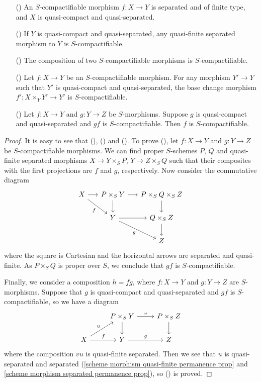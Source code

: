 \begin{proposition}\label{scheme S-compactifiable morphism permanence prop}
\begin{enumerate}
    \item[(\rmnum{1})] An $S$-compactifiable morphism $f:X\to Y$ is separated and of finite type, and $X$ is quasi-compact and quasi-separated.
    \item[(\rmnum{2})] If $Y$ is quasi-compact and quasi-separated, any quasi-finite separated morphism to $Y$ is $S$-compactifiable.
    \item[(\rmnum{3})] The composition of two $S$-compactifiable morphisms is $S$-compactifiable.
    \item[(\rmnum{4})] Let $f:X\to Y$ be an $S$-compactifiable morphism. For any morphism $Y'\to Y$ such that $Y'$ is quasi-compact and quasi-separated, the base change morphism $f':X\times_YY'\to Y'$ is $S$-compactifiable.
    \item[(\rmnum{5})] Let $f:X\to Y$ and $g:Y\to Z$ be $S$-morphisms. Suppose $g$ is quasi-compact and quasi-separated and $gf$ is $S$-compactifiable. Then $f$ is $S$-compactifiable.
\end{enumerate}
\end{proposition}
\begin{proof}
It is easy to see that (), () and (). To prove (), let $f:X\to Y$ and $g:Y\to Z$ be $S$-compactifiable morphisms. We can find proper $S$-schemes $P$, $Q$ and quasi-finite separated morphisms $X\to Y\times_SP$, $Y\to Z\times_SQ$ such that their composites with the first projections are $f$ and $g$, respectively. Now consider the commutative diagram
\[\begin{tikzcd}[column sep=5mm,row sep=6mm]
X\ar[r]\ar[rd,swap,"f"]&P\times_SY\ar[r]\ar[d]&P\times_SQ\times_SZ\ar[d]\\
&Y\ar[r]\ar[rd,swap,"g"]&Q\times_SZ\ar[d]\\
&&Z
\end{tikzcd}\]
where the square is Cartesian and the horizontal arrows are separated and quasi-finite. As $P\times_SQ$ is proper over $S$, we conclude that $gf$ is $S$-compactifiable.\par
Finally, we consider a composition $h=fg$, where $f:X\to Y$ and $g:Y\to Z$ are $S$-morphisms. Suppose that $g$ is quasi-compact and quasi-separated and $gf$ is $S$-compactifiable, so we have a diagram
\[\begin{tikzcd}
&P\times_SY\ar[r,"v"]\ar[d]&P\times_SZ\ar[d]\\
X\ar[ru,"u"]\ar[r,"f"]&Y\ar[r,"g"]&Z
\end{tikzcd}\]
where the composition $vu$ is quasi-finite separated. Then we see that $u$ is quasi-separated and separated (\cref{scheme morphism quasi-finite permanence prop} and \cref{scheme morphism separated permanence prop}), so () is proved.
\end{proof}

